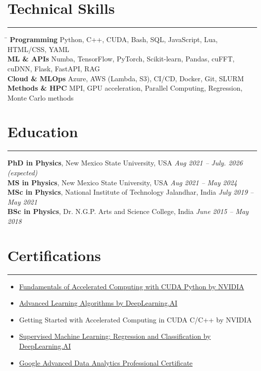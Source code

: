 \documentclass[11pt]{article}
\begin{document}
\section*{Technical Skills}
\hrule
\vspace{-0.3em}
\begin{tabbing}
\hspace{3.5cm} \= \kill
\textbf{Programming} \> Python, C++, CUDA, Bash, SQL, JavaScript, Lua, HTML/CSS, YAML \\
\textbf{ML \& APIs} \> Numba, TensorFlow, PyTorch, Scikit-learn, Pandas, cuFFT, cuDNN, Flask, FastAPI, RAG\\
\textbf{Cloud \& MLOps} \> Azure, AWS (Lambda, S3), CI/CD, Docker, Git, SLURM\\
\textbf{Methods \& HPC} \> MPI, GPU acceleration, Parallel Computing, Regression, Monte Carlo methods
\end{tabbing}

\section*{Education}
\hrule
\vspace{0.3em}

\textbf{PhD in Physics}, New Mexico State University, USA \hfill \textit{Aug 2021 – July. 2026 (expected)} \\
\textbf{MS in Physics}, New Mexico State University, USA \hfill \textit{Aug 2021 – May 2024} \\
\textbf{MSc in Physics}, National Institute of Technology Jalandhar, India \hfill \textit{July 2019 – May 2021} \\
\textbf{BSc in Physics}, Dr. N.G.P. Arts and Science College, India \hfill \textit{June 2015 – May 2018}


\section*{Certifications}
\hrule
\vspace{-0.3em}
\begin{itemize}
    \item \href{https://learn.nvidia.com/certificates?id=mMWLgny_SEC5DgHXY9XYEw}{Fundamentals of Accelerated Computing with CUDA Python by NVIDIA} 
    \item \href{https://www.coursera.org/account/accomplishments/verify/XG3YT41S0PF5}{Advanced Learning Algorithms by DeepLearning.AI} 
    \item Getting Started with Accelerated Computing in CUDA C/C++ by NVIDIA
    \item \href{https://coursera.org/share/b9cffe9c5ba5832ffb99bf7abdd8c384}{Supervised Machine Learning: Regression and Classification by DeepLearning.AI} 
    \item \href{https://www.coursera.org/account/accomplishments/professional-cert/certificate/U0HU8UKT89L4}{Google Advanced Data Analytics Professional Certificate} 
\end{itemize}
\end{document}
